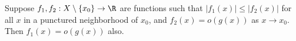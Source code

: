 \begin{exercise} \label{less-than-small-is-small}
	Suppose $f_1, f_2 : X \setminus \{x_0\} \to \R$ are functions such that $|f_1(x)| \leq |f_2(x)|$ for all $x$ in a punctured neighborhood of $x_0$, and $f_2(x) = o(g(x))$ as $x \to x_0$. Then $f_1(x) = o(g(x))$ also. 
\end{exercise}


